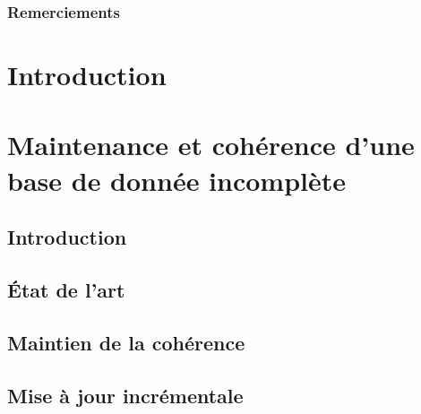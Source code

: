 
\pagestyle{fancy}


\frontmatter
\section*{Remerciements}
\lipsum[17-19]

\newpage

\tableofcontents
{}
\listoffigures
{}
\listoftables

\mainmatter

\part{Introduction}



\part{Maintenance et cohérence d'une base de donnée incomplète}

\chapter{Introduction}


\chapter{État de l'art}


\chapter{Maintien de la cohérence}


\chapter{Mise à jour incrémentale}


